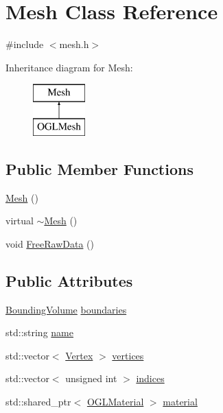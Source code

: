 \hypertarget{class_mesh}{}\section{Mesh Class Reference}
\label{class_mesh}


{\ttfamily \#include $<$mesh.\+h$>$}

Inheritance diagram for Mesh\+:\begin{figure}[H]
\begin{center}
\leavevmode
\includegraphics[height=2.000000cm]{class_mesh}
\end{center}
\end{figure}
\subsection*{Public Member Functions}
\begin{DoxyCompactItemize}
\item 
\hyperlink{class_mesh_a2af137f1571af89172b9c102302c416b}{Mesh} ()
\item 
virtual \hyperlink{class_mesh_a5efe4da1a4c0971cfb037bd70304c303}{$\sim$\+Mesh} ()
\item 
void \hyperlink{class_mesh_ae89fa54cbcdae224c00bbe5501ac2f05}{Free\+Raw\+Data} ()
\end{DoxyCompactItemize}
\subsection*{Public Attributes}
\begin{DoxyCompactItemize}
\item 
\hyperlink{class_bounding_volume}{Bounding\+Volume} \hyperlink{class_mesh_af058fb0d0fd3933311a4a05621ec95f7}{boundaries}
\item 
std\+::string \hyperlink{class_mesh_ac687e9dcfc7cc60b046fc2ec634200be}{name}
\item 
std\+::vector$<$ \hyperlink{struct_vertex}{Vertex} $>$ \hyperlink{class_mesh_a6465a888c97232a39e12aad008c969c3}{vertices}
\item 
std\+::vector$<$ unsigned int $>$ \hyperlink{class_mesh_a26632e27b772f24b069a738e7983b9da}{indices}
\item 
std\+::shared\+\_\+ptr$<$ \hyperlink{class_o_g_l_material}{O\+G\+L\+Material} $>$ \hyperlink{class_mesh_ae392f8f4565054b3ef98ab2d41f86cc9}{material}
\end{DoxyCompactItemize}


